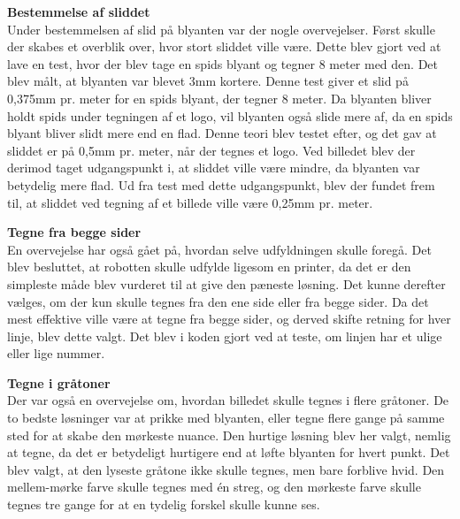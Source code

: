 \textbf{Bestemmelse af sliddet}\\
Under bestemmelsen af slid på blyanten var der nogle overvejelser. Først skulle der skabes et overblik over, hvor stort sliddet ville være. Dette blev gjort ved at lave en test, hvor der blev tage en spids blyant og tegner 8 meter med den. Det blev målt, at blyanten var blevet 3mm kortere. Denne test giver et slid på 0,375mm pr. meter for en spids blyant, der tegner 8 meter. Da blyanten bliver holdt spids under tegningen af et logo, vil blyanten også slide mere af, da en spids blyant bliver slidt mere end en flad. Denne teori blev testet efter, og det gav at sliddet er på 0,5mm pr. meter, når der tegnes et logo. Ved billedet blev der derimod taget udgangspunkt i, at sliddet ville være mindre, da blyanten var betydelig mere flad. Ud fra test med dette udgangspunkt, blev der fundet frem til, at sliddet ved tegning af et billede ville være 0,25mm pr. meter.

\textbf{Tegne fra begge sider}\\
En overvejelse har også gået på, hvordan selve udfyldningen skulle foregå. Det blev besluttet, at robotten skulle udfylde ligesom en printer, da det er den simpleste måde blev vurderet til at give den pæneste løsning. Det kunne derefter vælges, om der kun skulle tegnes fra den ene side eller fra begge sider. Da det mest effektive ville være at tegne fra begge sider, og derved skifte retning for hver linje, blev dette valgt. Det blev i koden gjort ved at teste, om linjen har et ulige eller lige nummer. 

\textbf{Tegne i gråtoner}\\
Der var også en overvejelse om, hvordan billedet skulle tegnes i flere gråtoner. De to bedste løsninger var at prikke med blyanten, eller tegne flere gange på samme sted for at skabe den mørkeste nuance. Den hurtige løsning blev her valgt, nemlig at tegne, da det er betydeligt hurtigere end at løfte blyanten for hvert punkt. Det blev valgt, at den lyseste gråtone ikke skulle tegnes, men bare forblive hvid. Den mellem-mørke farve skulle tegnes med én streg, og den mørkeste farve skulle tegnes tre gange for at en tydelig forskel skulle kunne ses. 

